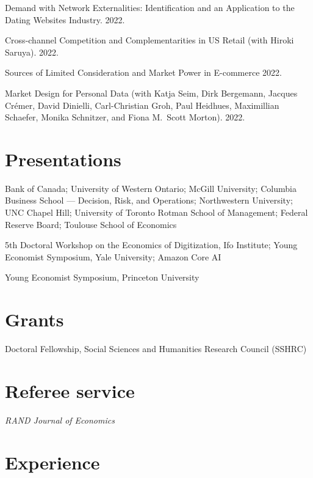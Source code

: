 \documentclass[11pt]{article} %
\begin{document}
\medskip
 
Demand with Network Externalities: 
Identification and an Application to the Dating Websites Industry. 2022.

\medskip

Cross-channel Competition and Complementarities in US Retail
(with Hiroki Saruya). 2022.

\medskip

Sources of Limited Consideration and Market Power in E-commerce 2022.

\medskip

Market Design for Personal Data
(with Katja Seim, Dirk Bergemann, Jacques Cr\'{e}mer, David Dinielli, 
Carl-Christian Groh, Paul Heidhues, Maximillian Schaefer, 
Monika Schnitzer, and Fiona M.\ Scott Morton).
2022.




\section*{Presentations}

 Bank of Canada; University of Western Ontario;
	McGill University; Columbia Business School --- Decision, Risk, and Operations;
	Northwestern University; UNC Chapel Hill; University of Toronto Rotman School
	of Management; Federal Reserve Board; Toulouse School of Economics


 5th Doctoral Workshop on the Economics of Digitization, Ifo Institute; 
	Young Economist Symposium, Yale University; Amazon Core AI


 Young Economist Symposium, Princeton University

\section*{Grants}

 Doctoral Fellowship, Social Sciences and Humanities Research Council (SSHRC)


\section*{Referee service}

\textit{RAND Journal of Economics}

\section*{Experience}
\end{document}
